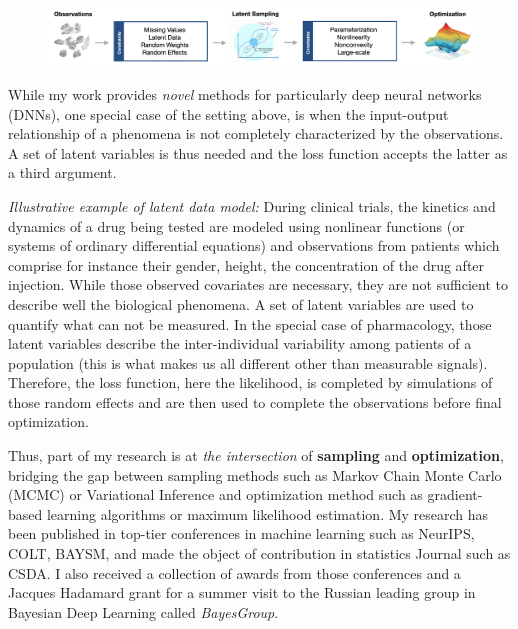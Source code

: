 \documentclass[twoside,11pt]{article}
\begin{document}
\begin{figure}[h]
\centering
\includegraphics[width=\textwidth]{fig3}
\end{figure}

While my work provides \emph{novel} methods for particularly deep neural networks (DNNs), one special case of the setting above, is when the input-output relationship of a phenomena is not completely characterized by the observations.
A set of latent variables is thus needed and the loss function accepts the latter as a third argument.

\textit{ Illustrative example of latent data model:} 
During clinical trials, the kinetics and dynamics of a drug being tested are modeled using nonlinear functions (or systems of ordinary differential equations) and observations from patients which comprise for instance their gender, height, the concentration of the drug after injection.
While those observed covariates are necessary, they are not sufficient to describe well the biological phenomena. 
A set of latent variables are used to quantify what can not be measured. 
In the special case of pharmacology, those latent variables describe the inter-individual variability among patients of a population (this is what makes us all different other than measurable signals). 
Therefore, the loss function, here the likelihood, is completed by simulations of those random effects and are then used to complete the observations before final optimization.

Thus, part of my research is at \emph{the intersection} of \textbf{sampling} and \textbf{optimization}, bridging the gap between sampling methods such as Markov Chain Monte Carlo (MCMC) or Variational Inference and optimization method such as gradient-based learning algorithms or maximum likelihood estimation.
My research has been published in top-tier conferences in machine learning such as NeurIPS, COLT, BAYSM, and made the object of contribution in statistics Journal such as CSDA. I also received a collection of awards from those conferences and a Jacques Hadamard grant for a summer visit to the Russian leading group in Bayesian Deep Learning called \emph{BayesGroup}.

\end{document}
